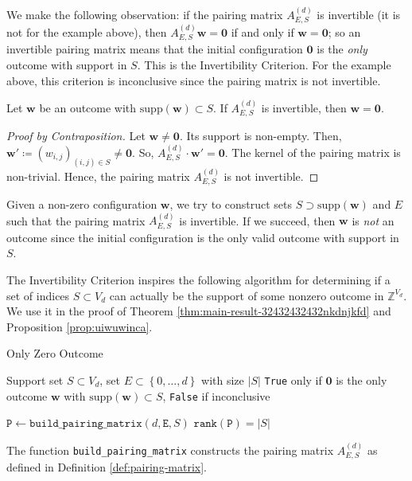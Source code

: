 We make the following observation: if the pairing matrix \( A^{(d)}_{E,S} \) is invertible (it is not for the example above), then \( A^{(d)}_{E,S} \mathbf w = \mathbf 0 \) if and only if \( \mathbf w = \mathbf 0 \); so an invertible pairing matrix means that the initial configuration \( \mathbf{0} \) is the \emph{only} outcome with support in \( S \). This is the Invertibility Criterion. For the example above, this criterion is inconclusive since the pairing matrix is not invertible.

\begin{proposition}
    Let \( \mathbf{w} \) be an outcome with \( \mathrm{supp}(\mathbf w) \subset S \).
    If \( A^{(d)}_{E,S} \) is invertible, then \( \mathbf{w} = \mathbf 0 \).
\end{proposition}

\begin{proof}[Proof by Contraposition]
    Let \( \mathbf{w} \neq \mathbf 0 \). Its support is non-empty. Then, \( \mathbf w' \coloneqq (w_{i,j})_{(i,j) \in S} \neq \mathbf 0 \). So, \( A^{(d)}_{E,S} \cdot \mathbf w' = \mathbf 0 \). The kernel of the pairing matrix is non-trivial. Hence, the pairing matrix \( A^{(d)}_{E,S} \) is not invertible.
\end{proof}

Given a non-zero configuration \( \mathbf{w} \), we try to construct sets \( S \supset \mathrm{supp}(\mathbf w) \) and \( E \) such that the pairing matrix \( A_{E,S}^{(d)} \) is invertible. If we succeed, then \( \mathbf{w} \) is \emph{not} an outcome since the initial configuration is the only valid outcome with support in \( S \). 


The Invertibility Criterion inspires the following algorithm for determining if a set of indices \( S \subset V_d \) can actually be the support of some nonzero outcome in \( \mathbb{Z}^{V_d} \). We use it in the proof of Theorem \ref{thm:main-result-32432432432nkdnjkfd} and Proposition \ref{prop:uiwuwinca}.


\begin{algorithm}[H]
\caption{Only Zero Outcome}\label{alg:hyperfield_criterion:is_zero}
    \begin{algorithmic}[1]
    \Require Support set $S \subset {V_d}$, set \( E \subset \left\{ 0, \dots, d \right\} \) with size \( \lvert S \vert \)
    \Ensure \texttt{True} only if \( \mathbf{0} \) is the only outcome \( \mathbf{w} \) with \( \mathrm{supp}(\mathbf{w}) \subset S \), \texttt{False} if inconclusive

    \State $\texttt{P} \gets \texttt{build\_pairing\_matrix}(d, \texttt{E}, S)$    
    \State \Return $\texttt{rank}(\texttt{P}) = |S|$
    \end{algorithmic}  
\end{algorithm}
The function \texttt{build\_pairing\_matrix} constructs the pairing matrix \( A^{(d)}_{E,S} \) as defined in Definition \ref{def:pairing-matrix}.

